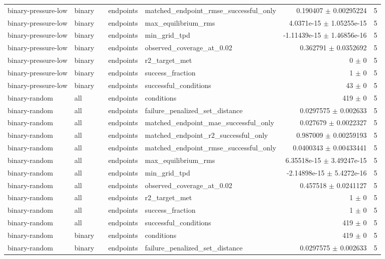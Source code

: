 \begin{tabular}{lllllrr}
binary-pressure-low & binary &  & endpoints & matched_endpoint_rmse_successful_only & 0.190407 $\pm$ 0.00295224 & 5 \\
binary-pressure-low & binary &  & endpoints & max_equilibrium_rms & 4.0371e-15 $\pm$ 1.05255e-15 & 5 \\
binary-pressure-low & binary &  & endpoints & min_grid_tpd & -1.11439e-15 $\pm$ 1.46856e-16 & 5 \\
binary-pressure-low & binary &  & endpoints & observed_coverage_at_0.02 & 0.362791 $\pm$ 0.0352692 & 5 \\
binary-pressure-low & binary &  & endpoints & r2_target_met & 0 $\pm$ 0 & 5 \\
binary-pressure-low & binary &  & endpoints & success_fraction & 1 $\pm$ 0 & 5 \\
binary-pressure-low & binary &  & endpoints & successful_conditions & 43 $\pm$ 0 & 5 \\
binary-random & all &  & endpoints & conditions & 419 $\pm$ 0 & 5 \\
binary-random & all &  & endpoints & failure_penalized_set_distance & 0.0297575 $\pm$ 0.002633 & 5 \\
binary-random & all &  & endpoints & matched_endpoint_mae_successful_only & 0.027679 $\pm$ 0.0022327 & 5 \\
binary-random & all &  & endpoints & matched_endpoint_r2_successful_only & 0.987009 $\pm$ 0.00259193 & 5 \\
binary-random & all &  & endpoints & matched_endpoint_rmse_successful_only & 0.0400343 $\pm$ 0.00433441 & 5 \\
binary-random & all &  & endpoints & max_equilibrium_rms & 6.35518e-15 $\pm$ 3.49247e-15 & 5 \\
binary-random & all &  & endpoints & min_grid_tpd & -2.14898e-15 $\pm$ 5.4272e-16 & 5 \\
binary-random & all &  & endpoints & observed_coverage_at_0.02 & 0.457518 $\pm$ 0.0241127 & 5 \\
binary-random & all &  & endpoints & r2_target_met & 1 $\pm$ 0 & 5 \\
binary-random & all &  & endpoints & success_fraction & 1 $\pm$ 0 & 5 \\
binary-random & all &  & endpoints & successful_conditions & 419 $\pm$ 0 & 5 \\
binary-random & binary &  & endpoints & conditions & 419 $\pm$ 0 & 5 \\
binary-random & binary &  & endpoints & failure_penalized_set_distance & 0.0297575 $\pm$ 0.002633 & 5 \\

\end{tabular}
